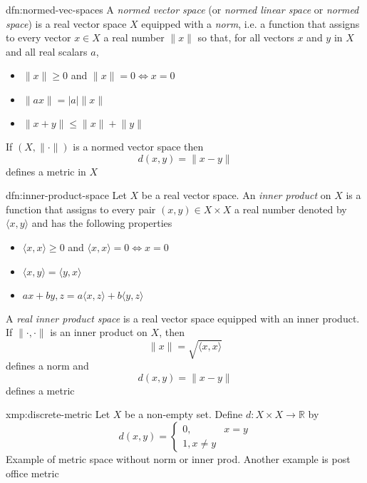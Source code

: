 \documentclass{article}
\begin{document}
\begin{dfn}{dfn:normed-vec-spaces}{}
    A \textit{normed vector space} (or \textit{normed linear space} or \textit{normed space}) is a real vector space $X$ equipped with a \textit{norm}, i.e. a function that assigns to every vector $x\in X$ a real number $\lVert x \rVert$ so that, for all vectors $x$ and $y$ in $X$ and all real scalars $a$,
    \begin{itemize}
        \item $\lVert x\rVert\ge 0 $ and $\lVert x \rVert = 0 \iff x = 0$
        \item $\lVert ax \rVert = \lvert a \rvert\lVert x \rVert$
        \item $\lVert x+y \rVert\le \lVert x \rVert + \lVert y \rVert$
    \end{itemize}
    If $(X, \lVert \cdot \rVert)$ is a normed vector space then
    \[d(x,y) = \lVert x - y \rVert\]
    defines a metric in $X$
\end{dfn}

\begin{dfn}{dfn:inner-product-space}{}
    Let $X$ be a real vector space. An \textit{inner product} on $X$ is a function that assigns to every pair $(x,y)\in X \times X $ a real number denoted by $\langle x,y \rangle$ and has the following properties
    \begin{itemize}
        \item $\langle x,x \rangle\ge 0$ and $\langle x,x \rangle = 0 \iff x = 0$
        \item $\langle x,y \rangle = \langle y,x \rangle$
        \item $ax + by, z = a\langle x,z \rangle + b\langle y,z \rangle$
    \end{itemize}
    A \textit{real inner product space} is a real vector space equipped with an inner product.
    If $\lVert \cdot , \cdot \rVert$ is an inner product on $X$, then
    \[\lVert x \rVert = \sqrt{\langle x,x \rangle}\]
    defines a norm and
    \[d(x,y) = \lVert x - y \rVert\]
    defines a metric
\end{dfn}

\begin{xmp}{xmp:discrete-metric}{}
    Let $X$ be a non-empty set. Define $d: X \times X \to \mathbb{R}$ by
    \[d(x,y) = \begin{cases}
        0, &x = y \\
        1, x \ne y
    \end{cases}\]
    Example of metric space without norm or inner prod. Another example is post office metric
\end{xmp}
\end{document}
